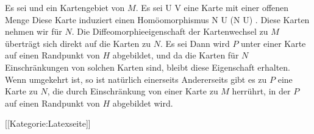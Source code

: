 Es sei
 und
 ein Kartengebiet von $M$. Es sei
\maabbdisp {\alpha} { U } {V
} {}
eine Karte mit einer offenen Menge
 Diese Karte induziert einen Homöomorphismus
\maabbdisp {} {N \cap U} { \alpha (N \cap U)
} {.}
Diese Karten nehmen wir für $N$. Die Diffeomorphieeigenschaft der Kartenwechsel zu $M$ überträgt sich direkt auf die Karten zu $N$. Es sei
 Dann wird $P$ unter einer Karte auf einen Randpunkt von $H$ abgebildet, und da die Karten für $N$ Einschränkungen von solchen Karten sind, bleibt diese Eigenschaft erhalten. Wenn umgekehrt
 ist, so ist natürlich einerseits
 Andererseits gibt es zu $P$ eine Karte zu $N$, die durch Einschränkung von einer Karte zu $M$ herrührt, in der $P$ auf einen Randpunkt von $H$ abgebildet wird.

 [[Kategorie:Latexseite]]
